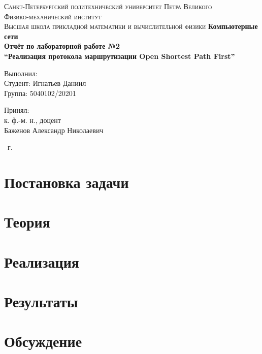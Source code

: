 \documentclass[14pt,a4paper,article]{ncc}
\begin{document}
\begin{titlepage}
    \begin{center}
        \textsc{
            Санкт-Петербургский политехнический университет Петра Великого \\[5mm]
            Физико-механический институт\\[2mm]
            Высшая школа прикладной математики и вычислительной физики
        }   
        \vfill
        \textbf{\large
            Компьютерные сети\\
            Отчёт по лабораторной работе №2 \\
            ``Реализация протокола маршрутизации Open Shortest Path First'' \\[3mm]
        }                
    \end{center}

    \vfill
    \hfill
    \begin{minipage}{0.5\textwidth}
        Выполнил: \\[2mm]   
		Студент: Игнатьев Даниил \\
		Группа: 5040102/20201\\
    \end{minipage}

	\hfill
	\begin{minipage}{0.5\textwidth}
		Принял: \\[2mm]
		к. ф.-м. н., доцент \\   
		Баженов Александр Николаевич
	\end{minipage}

    \vfill
    \begin{center}
        \theyear\ г.
    \end{center}
\end{titlepage}

\tableofcontents
\newpage

\section{Постановка задачи}


\section{Теория}


\section{Реализация}


\section{Результаты}


\section{Обсуждение}


\printbibliography


\end{document}
